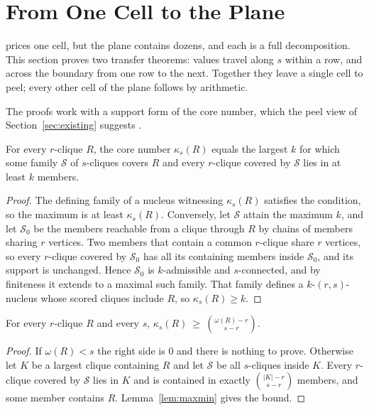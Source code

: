 \section{From One Cell to the Plane}\label{sec:plane}
\peelcell{} prices one cell, but the plane contains dozens, and each is a full decomposition.
%
This section proves two transfer theorems: values travel along $s$ within a row, and across the boundary from one row to the next.
%
Together they leave a single cell to peel; every other cell of the plane follows by arithmetic.

The proofs work with a support form of the core number, which the peel view of Section~\ref{sec:existing} suggests \cite{firstNucleus}.

\begin{lemma}\label{lem:maxmin}
For every $r$-clique $R$, the core number $\kappa_s(R)$ equals the largest $k$ for which some family $\mathcal{S}$ of $s$-cliques covers $R$ and every $r$-clique covered by $\mathcal{S}$ lies in at least $k$ members.
\end{lemma}

\begin{proof}
The defining family of a nucleus witnessing $\kappa_s(R)$ satisfies the condition, so the maximum is at least $\kappa_s(R)$.
%
Conversely, let $\mathcal{S}$ attain the maximum $k$, and let $\mathcal{S}_0$ be the members reachable from a clique through $R$ by chains of members sharing $r$ vertices.
%
Two members that contain a common $r$-clique share $r$ vertices, so every $r$-clique covered by $\mathcal{S}_0$ has all its containing members inside $\mathcal{S}_0$, and its support is unchanged.
%
Hence $\mathcal{S}_0$ is $k$-admissible and $s$-connected, and by finiteness it extends to a maximal such family.
%
That family defines a $k$-$(r,s)$-nucleus whose scored cliques include $R$, so $\kappa_s(R)\ge k$.
\end{proof}

\begin{lemma}\label{lem:floor}
For every $r$-clique $R$ and every $s$,
$\kappa_s(R)\ \ge\ \binom{\omega(R)-r}{\,s-r\,}$.
\end{lemma}

\begin{proof}
If $\omega(R)<s$ the right side is $0$ and there is nothing to prove.
%
Otherwise let $K$ be a largest clique containing $R$ and let $\mathcal{S}$ be all $s$-cliques inside $K$.
%
Every $r$-clique covered by $\mathcal{S}$ lies in $K$ and is contained in exactly $\binom{|K|-r}{s-r}$ members, and some member contains $R$.
%
Lemma~\ref{lem:maxmin} gives the bound.
\end{proof}

